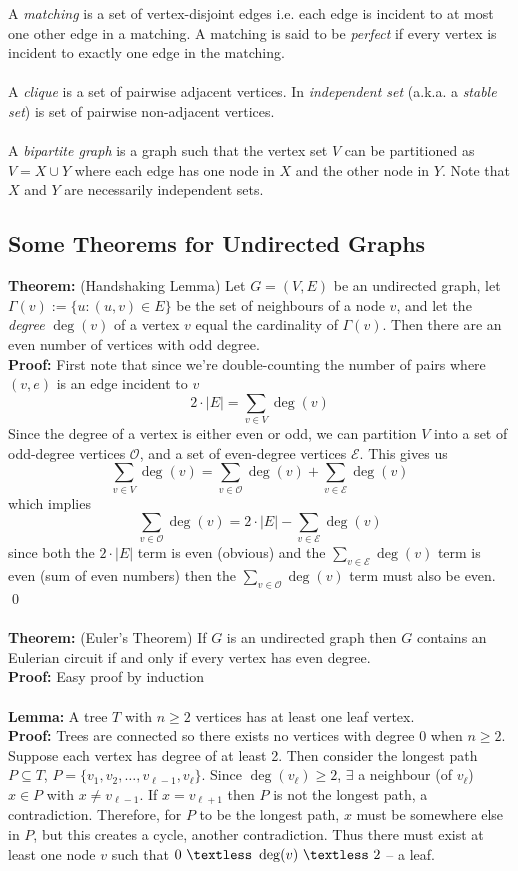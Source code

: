 \documentclass{article}
\newcommand{\ti}[1]{\textit{#1}}
\newcommand{\lt}{\textless}
\newcommand{\x}{\cdot}
\newcommand{\Ga}{\Gamma}
\newcommand{\thm}{\textbf{Theorem: }}
\newcommand{\lem}{\textbf{Lemma: }}
\newcommand{\proo}{\textbf{Proof: }}
\begin{document}
A \ti{matching} is a set of vertex-disjoint edges i.e. each edge is incident to at most one other edge in a matching. A matching is said to be \ti{perfect} if every vertex is incident to exactly one edge in the matching.\\\\
A \ti{clique} is a set of pairwise adjacent vertices. In \ti{independent set} (a.k.a. a \ti{stable set}) is set of pairwise non-adjacent vertices.\\\\
A \ti{bipartite graph} is a graph such that the vertex set $V$ can be partitioned as $V = X \cup Y$ where each edge has one node in $X$ and the other node in $Y$. Note that $X$ and $Y$ are necessarily independent sets.
\subsection{Some Theorems for Undirected Graphs}
\thm (Handshaking Lemma) Let $G = (V, E)$ be an undirected graph, let $\Ga(v) := \{u : (u, v) \in E\}$ be the set of neighbours of a node $v$, and let the \ti{degree} $\deg(v)$ of a vertex $v$ equal the cardinality of $\Ga(v)$. Then there are an even number of vertices with odd degree.\\
\proo First note that since we're double-counting the number of pairs where $(v, e)$ is an edge incident to $v$
\[2 \x |E| = \sum_{v \in V} \deg(v) \]
Since the degree of a vertex is either even or odd, we can partition $V$ into a set of odd-degree vertices $\mathcal{O}$, and a set of even-degree vertices $\mathcal{E}$. This gives us
\[\sum_{v \in V} \deg(v) = \sum_{v \in \mathcal{O}} \deg(v) + \sum_{v \in \mathcal{E}} \deg(v)\]
which implies
\[\sum_{v \in \mathcal{O}} \deg(v) = 2\x |E| - \sum_{v \in \mathcal{E}} \deg(v)\]
since both the $2\x |E|$ term is even (obvious) and the $\displaystyle \sum_{v \in \mathcal{E}} \deg(v)$ term is even (sum of even numbers) then the $\displaystyle \sum_{v \in \mathcal{O}} \deg(v)$ term must also be even.
\qed\\\\
\thm (Euler's Theorem) If $G$ is an undirected graph then $G$ contains an Eulerian circuit if and only if every vertex has even degree.\\
\proo Easy proof by induction\\\\
\lem A tree $T$ with $n \geq 2$ vertices has at least one leaf vertex.\\
\proo Trees are connected so there exists no vertices with degree 0 when $n \geq 2$. Suppose each vertex has degree of at least 2. Then consider the longest path $P \subseteq T$, $P = \{v_1, v_2, \dots, v_{\ell-1}, v_{\ell}\}$. Since $\deg(v_{\ell}) \geq 2$, $\exists$ a neighbour (of $v_{\ell}$) $x \in P$ with $x \neq v_{\ell-1}$. If $x = v_{\ell + 1}$ then $P$ is not the longest path, a contradiction. Therefore, for $P$ to be the longest path, $x$ must be somewhere else in $P$, but this creates a cycle, another contradiction. Thus there must exist at least one node $v$ such that $0\ \lt\ \deg(v)\ \lt\ 2$ -- a leaf.
\end{document}
